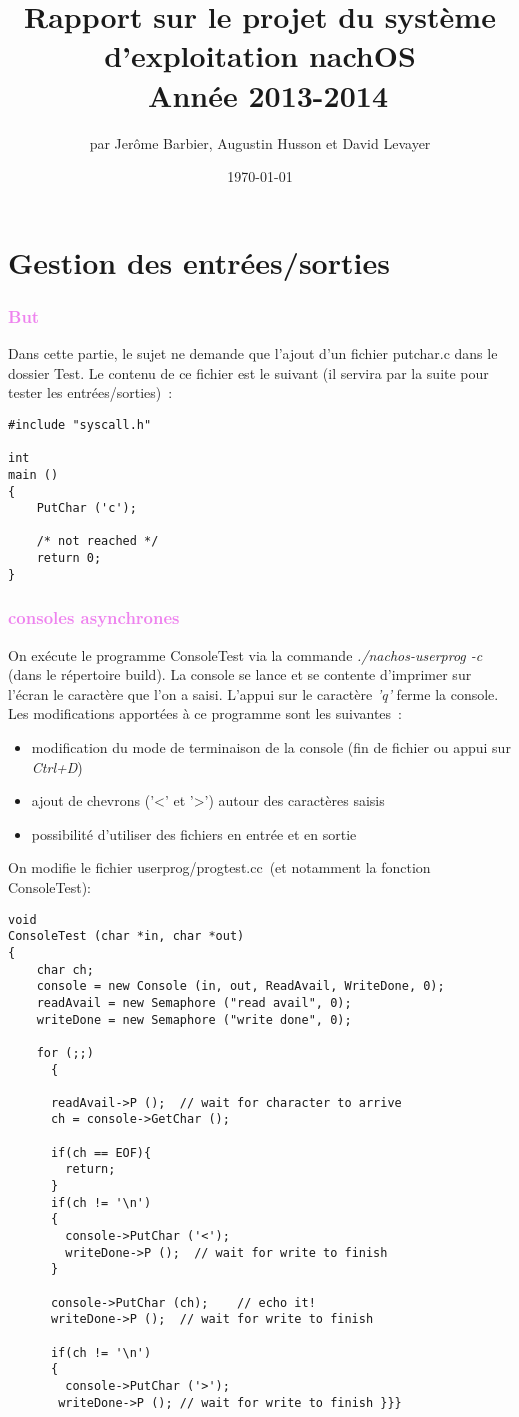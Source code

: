 \documentclass[a4paper,10pt]{report}
\title{Rapport sur le projet du système d'exploitation nachOS\\ Année 2013-2014}
\author{par Jerôme Barbier, Augustin Husson et David Levayer}
\date{\today}
\begin{document}
   \maketitle
  \tableofcontents
  \newpage
  \part{Gestion des entrées/sorties}
  \textcolor{Violet}{\section{But}}
  Dans cette partie, le sujet ne demande que l'ajout d'un fichier putchar.c dans le dossier Test. 
  Le contenu de ce fichier est le suivant (il servira par la suite pour tester les entrées/sorties) :
  \begin{lstlisting}
#include "syscall.h"

int
main ()
{
    PutChar ('c');

    /* not reached */
    return 0;
}   
  \end{lstlisting}
 \textcolor{Violet}{\section{consoles asynchrones}}
 On exécute le programme ConsoleTest via la commande \emph{./nachos-userprog -c} (dans le répertoire build). 
 La console se lance et se contente d'imprimer sur l'écran le caractère que l'on a saisi. L'appui sur le caractère \emph{'q'} ferme la console.
 Les modifications apportées à ce programme sont les suivantes :
 \begin{itemize}
  \item modification du mode de terminaison de la console (fin de fichier ou appui sur \emph{Ctrl+D})
  \item ajout de chevrons ('<' et '>') autour des caractères saisis
  \item possibilité d'utiliser des fichiers en entrée et en sortie
 \end{itemize}
On modifie le fichier userprog/progtest.cc (et notamment la fonction ConsoleTest):
\begin{lstlisting}
void
ConsoleTest (char *in, char *out)
{
    char ch;
    console = new Console (in, out, ReadAvail, WriteDone, 0);
    readAvail = new Semaphore ("read avail", 0);
    writeDone = new Semaphore ("write done", 0);

    for (;;)
      {

	  readAvail->P ();	// wait for character to arrive
	  ch = console->GetChar ();

      if(ch == EOF){
        return;
      }
      if(ch != '\n')
      {
        console->PutChar ('<');
        writeDone->P ();  // wait for write to finish
      }

	  console->PutChar (ch);	// echo it!
      writeDone->P ();  // wait for write to finish

      if(ch != '\n')
      {
        console->PutChar ('>');
	   writeDone->P ();	// wait for write to finish }}}
\end{lstlisting}
\end{document}
